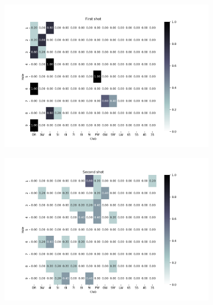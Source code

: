 \documentclass{kththesis}
\begin{document}
\begin{figure}
    \centering
    \begin{subfigure}{\textwidth}
    \centering
    \includegraphics[height=0.3\textheight]{L2ClubChoices/Ludvig_Pebble_Club_Choices_First_Shot.png} 
    \end{subfigure}
    \begin{subfigure}{\textwidth}
    \centering
    \includegraphics[height=0.3\textheight]{L2ClubChoices/Ludvig_Pebble_Club_Choices_Second_Shot.png} 
    \end{subfigure}
    \begin{subfigure}{\textwidth}
    \centering

\end{subfigure}
\end{figure}
\end{document}
